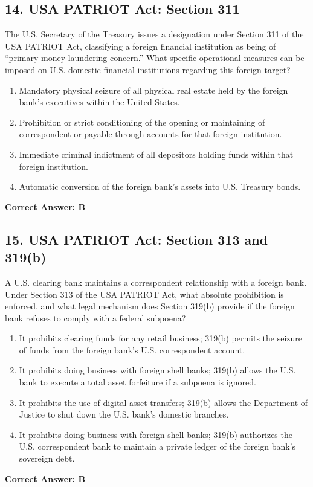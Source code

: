 \documentclass[11pt,a4paper]{article}
\begin{document}
	\subsection{14. USA PATRIOT Act: Section 311}
	The U.S. Secretary of the Treasury issues a designation under Section 311 of the USA PATRIOT Act, classifying a foreign financial institution as being of ``primary money laundering concern.'' What specific operational measures can be imposed on U.S. domestic financial institutions regarding this foreign target?
	\begin{enumerate}[label=\Alph*.]
		\item Mandatory physical seizure of all physical real estate held by the foreign bank's executives within the United States.
		\item Prohibition or strict conditioning of the opening or maintaining of correspondent or payable-through accounts for that foreign institution.
		\item Immediate criminal indictment of all depositors holding funds within that foreign institution.
		\item Automatic conversion of the foreign bank's assets into U.S. Treasury bonds.
	\end{enumerate}
	\textbf{Correct Answer: B}
	
	\subsection{15. USA PATRIOT Act: Section 313 and 319(b)}
	A U.S. clearing bank maintains a correspondent relationship with a foreign bank. Under Section 313 of the USA PATRIOT Act, what absolute prohibition is enforced, and what legal mechanism does Section 319(b) provide if the foreign bank refuses to comply with a federal subpoena?
	\begin{enumerate}[label=\Alph*.]
		\item It prohibits clearing funds for any retail business; 319(b) permits the seizure of funds from the foreign bank's U.S. correspondent account.
		\item It prohibits doing business with foreign shell banks; 319(b) allows the U.S. bank to execute a total asset forfeiture if a subpoena is ignored.
		\item It prohibits the use of digital asset transfers; 319(b) allows the Department of Justice to shut down the U.S. bank's domestic branches.
		\item It prohibits doing business with foreign shell banks; 319(b) authorizes the U.S. correspondent bank to maintain a private ledger of the foreign bank’s sovereign debt.
	\end{enumerate}
	\textbf{Correct Answer: B}
	
\end{document}

